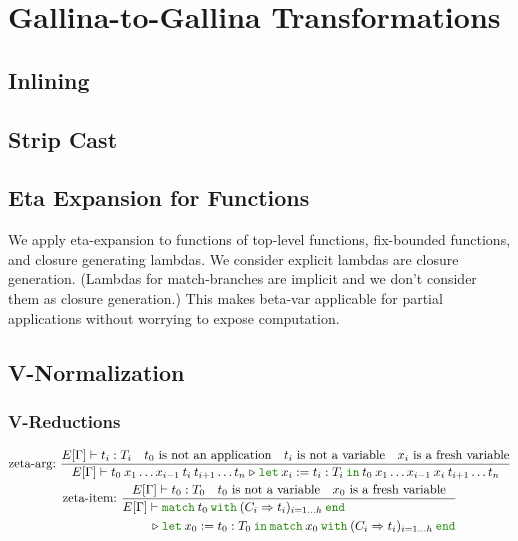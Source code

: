 \documentclass[a4paper,fleqn]{article}
\def\gallina{\textrm{Gallina}}
\newcommand{\kwlet}{\mbox{\color{mygreen}\ttfamily let}}
\newcommand{\kwin}{\mbox{\color{mygreen}\ttfamily in}}
\newcommand{\kwmatch}{\mbox{\color{mygreen}\ttfamily match}}
\newcommand{\kwwith}{\mbox{\color{mygreen}\ttfamily with}}
\newcommand{\kwend}{\mbox{\color{mygreen}\ttfamily end}}
\newcommand{\letin}[3]{\kwlet\:#1:=#2\:\kwin\:#3}
\newcommand{\match}[4]{\kwmatch\:#1\:\kwwith\:(#2 \Rightarrow #3)_{#4}\:\kwend}
\newcommand{\reltri}{\mathrel{\triangleright}}
\begin{document}
\section{\gallina-to-\gallina{} Transformations}\label{sec:gallina-to-gallina-transformations}

\subsection{Inlining}\label{sec:inlining}
\subsection{Strip Cast}\label{sec:strip-cast}
\subsection{Eta Expansion for Functions}\label{sec:eta-expand-funcs}
We apply eta-expansion to functions of top-level functions, fix-bounded functions, and closure generating lambdas.
We consider explicit lambdas are closure generation.
(Lambdas for match-branches are implicit and we don't consider them as closure generation.)
This makes beta-var applicable for partial applications without worrying to expose computation.

\subsection{V-Normalization}\label{sec:v-normalization}
\subsubsection{V-Reductions}\label{sec:v-reductions}
\begin{gather*}
  \text{zeta-arg:}~
    \dfrac
    {
      E[\Gamma] \vdash t_i : T_i \quad
      \text{$t_0$ is not an application} \quad
      \text{$t_i$ is not a variable} \quad
      \text{$x_i$ is a fresh variable}
    }{
      E[\Gamma] \vdash
      t_0\:x_1 \ldots x_{i-1}\:t_i\:t_{i+1} \ldots t_n
      \reltri
      \letin{x_i}{t_i:T_i}{t_0\:x_1 \ldots x_{i-1}\:x_i\:t_{i+1} \ldots t_n}
    } \\
  \text{zeta-item:}~
    \dfrac
    {
      E[\Gamma] \vdash t_0 : T_0 \quad
      \text{$t_0$ is not a variable} \quad
      \text{$x_0$ is a fresh variable}
    }{
      \begin{aligned}
      E[\Gamma] \vdash\; &
        \match{t_0}{C_i}{t_i}{i=1\ldots h} \\
      \reltri\; &
        \letin{x_0}{t_0:T_0}{\match{x_0}{C_i}{t_i}{i=1\ldots h}}
      \end{aligned}
    }
\end{gather*}
\end{document}
